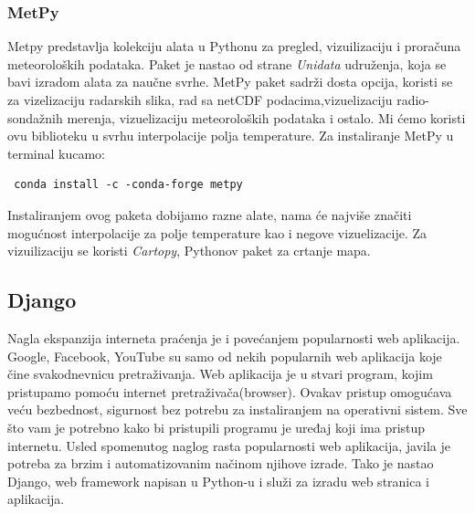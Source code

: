 \documentclass[12pt]{article}
\begin{document}
\subsubsection{MetPy}
Metpy predstavlja kolekciju alata u Pythonu za pregled, vizuilizaciju i proračuna meteoroloških podataka. Paket je nastao od strane \textsl{Unidata} udruženja, koja se bavi izradom alata za naučne svrhe. MetPy paket sadrži dosta opcija, koristi se za vizelizaciju radarskih slika, rad sa netCDF podacima,vizuelizaciju radio-sondažnih merenja, vizuelizaciju meteoroloških podataka i ostalo. Mi ćemo koristi ovu biblioteku u svrhu interpolacije polja temperature. Za instaliranje MetPy u terminal kucamo:
\begin{lstlisting}
 conda install -c -conda-forge metpy
\end{lstlisting}
Instaliranjem ovog paketa dobijamo razne alate, nama će najviše značiti mogućnost interpolacije za polje temperature kao i negove vizuelizacije. Za vizuilizaciju se koristi \textsl{Cartopy}, Pythonov paket za crtanje mapa.



\subsection{Django}

Nagla ekspanzija interneta praćenja je i povećanjem popularnosti web aplikacija. Google, Facebook, YouTube su samo od nekih popularnih web aplikacija koje čine svakodnevnicu pretraživanja. Web aplikacija je u stvari program, kojim pristupamo pomoću internet pretraživača(browser). Ovakav pristup omogućava veću bezbednost, sigurnost bez potrebu za instaliranjem na operativni sistem. Sve što vam je potrebno kako bi pristupili programu je uređaj koji ima pristup internetu. 
Usled spomenutog naglog rasta popularnosti web aplikacija, javila je potreba za brzim i automatizovanim načinom njihove izrade. Tako je nastao Django, web framework napisan u Python-u i služi za izradu web stranica i aplikacija. \\
\end{document}
